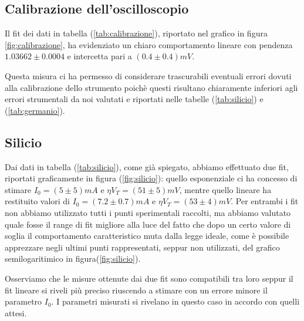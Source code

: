 \documentclass[]{article}
\begin{document}
  \subsection{Calibrazione dell'oscilloscopio}
Il fit dei dati in tabella (\ref{tab:calibrazione}), riportato nel grafico in figura \ref{fig:calibrazione}, ha evidenziato un chiaro comportamento lineare con pendenza $1.03662\pm0.0004$ e intercetta pari a $(0.4\pm0.4)mV$.
\begin{comment}
\begin{figure}[H]
	\centering
	\texttt{[image: ../Silicio/Calibrazione]}
	\caption{Retta di calibrazione delle tensioni dell'oscilloscopio}
	\label{fig:calibrazione}
\end{figure}	content...
\end{comment}
Questa misura ci ha permesso di considerare trascurabili eventuali errori dovuti alla calibrazione dello strumento poichè questi risultano chiaramente inferiori agli errori strumentali da noi valutati e riportati nelle tabelle (\ref{tab:silicio}) e (\ref{tab:germanio}).
\subsection{Silicio}
Dai dati in tabella (\ref{tab:silicio}), come già spiegato, abbiamo effettuato due fit, riportati graficamente in figura (\ref{fig:silicio}): quello esponenziale ci ha concesso di stimare $I_0=(5\pm5)mA$ e $\eta V_T=(51\pm5)mV$, mentre quello lineare ha restituito valori di $I_0=(7.2\pm0.7)mA$ e $\eta V_T=(53\pm4)mV$. Per entrambi i fit non abbiamo utilizzato tutti i punti sperimentali raccolti, ma abbiamo valutato quale fosse il range di fit migliore alla luce del fatto che dopo un certo valore di soglia il comportamento caratteristico muta dalla legge ideale, come è possibile apprezzare negli ultimi punti rappresentati, seppur non utilizzati, del grafico semilogaritimico in figura(\ref{fig:silicio}). 
\begin{comment}
	\begin{figure}[H]
		\centering
		\texttt{[image: ../Silicio/canvas]}
		\caption{Caratteristica I-V del diodo al Silicio: a sinistra sono riportati i punti nel range utilizzato per effettuare il fit esponenziale mentre a destra sono riportati tutti i punti sperimentali in scala semilogaritmica con fit lineare}
		\label{fig:silicio}
	\end{figure}content...
\end{comment}
Osserviamo che le misure ottenute dai due fit sono compatibili tra loro seppur il fit lineare si riveli più preciso riuscendo a stimare con un errore minore il parametro $I_0$.
I parametri misurati si rivelano in questo caso in accordo con quelli attesi.
\end{document}
